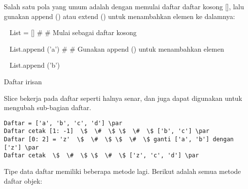\vspace{12pt}
Salah satu pola yang umum adalah dengan memulai daftar daftar kosong [], lalu gunakan append () atau extend () untuk menambahkan elemen ke dalamnya: \par
\vspace{12pt}
~ List = []  $  \#  $ $  \#  $ Mulai sebagai daftar kosong \par
~ List.append ('a')  $  \#  $ $  \#  $ Gunakan append () untuk menambahkan elemen \par
~ List.append ('b') \par
\vspace{12pt}
Daftar irisan \par
\vspace{12pt}
Slice bekerja pada daftar seperti halnya senar, dan juga dapat digunakan untuk mengubah sub-bagian daftar. \par
\vspace{12pt}
\begin{verbatim}
Daftar = ['a', 'b', 'c', 'd'] \par
Daftar cetak [1: -1]  \$  \#  \$ \$  \#  \$ ['b', 'c'] \par
Daftar [0: 2] = 'z'  \$  \#  \$ \$  \#  \$ ganti ['a', 'b'] dengan ['z'] \par
Daftar cetak  \$  \#  \$ \$  \#  \$ ['z', 'c', 'd'] \par
\end{verbatim}
Tipe data daftar memiliki beberapa metode lagi. Berikut adalah semua metode daftar objek: \par
